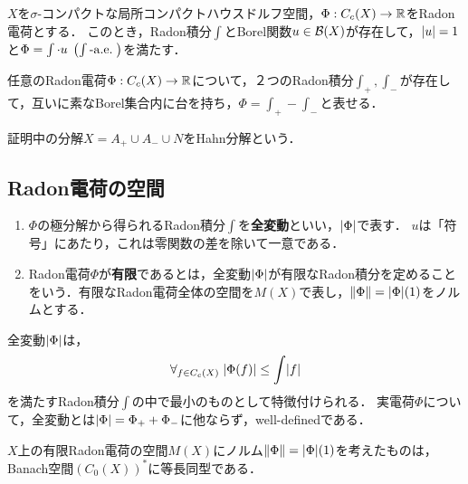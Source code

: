 \documentclass[uplatex,dvipdfmx]{jsreport}
\begin{document}
\begin{theorem}[Radon電荷の極分解]
    $X$を$\sigma$-コンパクトな局所コンパクトハウスドルフ空間，$\Phi:C_c(X)\to\mathbb{R}$をRadon電荷とする．
    このとき，Radon積分$\int$とBorel関数$u\in\mathcal{B}(X)$が存在して，$\lvert u\rvert=1$と$\Phi=\int\cdot u\;\left(\int\text{-}\mathrm{a.e.}\;\right)$を満たす．
\end{theorem}

\begin{corollary}
    任意のRadon電荷$\Phi:C_c(X)\to\mathbb{R}$について，２つのRadon積分$\int_+,\int_-$が存在して，互いに素なBorel集合内に台を持ち，$\Phi=\int_+-\int_-$と表せる．
\end{corollary}
\begin{remarks}
    証明中の分解$X=A_+\cup A_-\cup N$をHahn分解という．
\end{remarks}

\subsection{Radon電荷の空間}

\begin{definition}\mbox{}
    \begin{enumerate}
        \item $\Phi$の極分解から得られるRadon積分$\int$を\textbf{全変動}といい，$\lvert\Phi\rvert$で表す．
        $u$は「符号」にあたり，これは零関数の差を除いて一意である．
        \item Radon電荷$\Phi$が\textbf{有限}であるとは，全変動$\lvert\Phi\rvert$が有限なRadon積分を定めることをいう．有限なRadon電荷全体の空間を$M(X)$で表し，$\|\Phi\|=\lvert\Phi\rvert(1)$をノルムとする．
    \end{enumerate}
\end{definition}
\begin{remark}
    全変動$\lvert\Phi\rvert$は，
    \[\forall_{f\in C_c(X)}\;\lvert\Phi(f)\rvert\le\int\lvert f\rvert\]
    を満たすRadon積分$\int$の中で最小のものとして特徴付けられる．
    実電荷$\Phi$について，全変動とは$\lvert\Phi\rvert=\Phi_++\Phi_-$に他ならず，well-definedである．
\end{remark}

\begin{proposition}\label{prop-Riesz-Markov-3}
    $X$上の有限Radon電荷の空間$M(X)$にノルム$\|\Phi\|=\lvert\Phi\rvert(1)$を考えたものは，Banach空間$(C_0(X))^*$に等長同型である．
\end{proposition}
\end{document}

